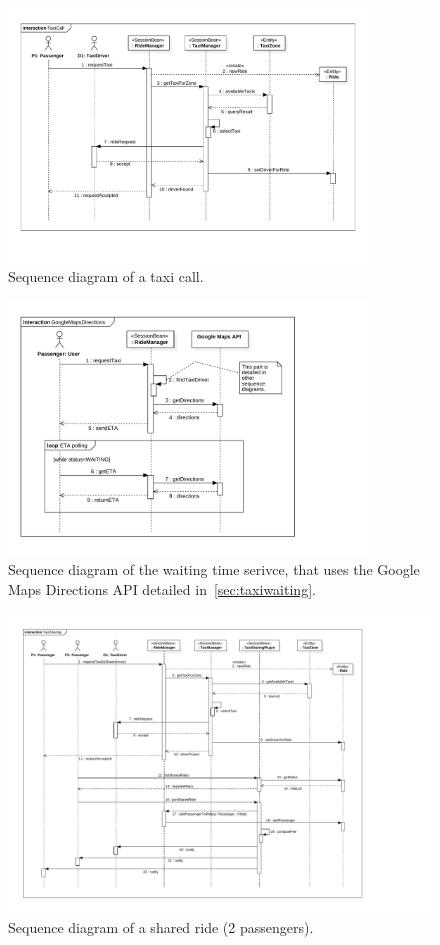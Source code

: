\begin{figure}[h]
    \centering
    \includegraphics[width=0.85\textwidth]{diagrams/sequence_taxicall}
    \caption{Sequence diagram of a taxi call.}
    \label{fig:sequence-taxicall}
\end{figure}

\begin{figure}[h]
    \centering
    \includegraphics[width=0.85\textwidth]{diagrams/sequence_gmaps}
    \caption{Sequence diagram of the waiting time serivce, that uses the Google Maps Directions API detailed in~\autoref{sec:taxiwaiting}.}
    \label{fig:sequence-gmaps}
\end{figure}

\begin{figure}[h]
    \centering
    \includegraphics[width=\textwidth]{diagrams/sequence_taxisharing}
    \caption{Sequence diagram of a shared ride (2 passengers).}
    \label{fig:sequence-sharing}
\end{figure}

\FloatBarrier
